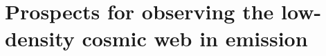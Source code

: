 \chapter{Prospects for observing the low-density cosmic web in \texorpdfstring{\lymana}{\lymanatext} emission}
\label{ch:Prospects_for_observing_the_low-density_cosmic_web_in_Lya_emission}

\ifsetDraft
\else
    \renewcommand{\CurrentTitleColor}{\color{black}}
    
    
    \BgThispage
    
